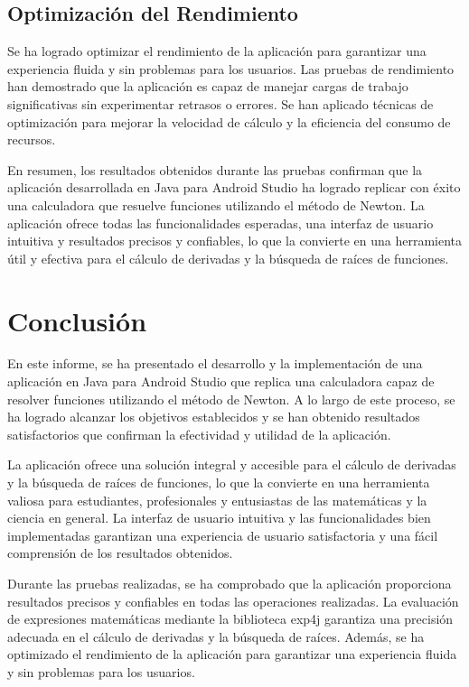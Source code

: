 \documentclass[conference]{IEEEtran}
\begin{document}
\subsection{Optimización del Rendimiento}

Se ha logrado optimizar el rendimiento de la aplicación para garantizar una experiencia fluida y sin problemas para los usuarios. Las pruebas de rendimiento han demostrado que la aplicación es capaz de manejar cargas de trabajo significativas sin experimentar retrasos o errores. Se han aplicado técnicas de optimización para mejorar la velocidad de cálculo y la eficiencia del consumo de recursos.

En resumen, los resultados obtenidos durante las pruebas confirman que la aplicación desarrollada en Java para Android Studio ha logrado replicar con éxito una calculadora que resuelve funciones utilizando el método de Newton. La aplicación ofrece todas las funcionalidades esperadas, una interfaz de usuario intuitiva y resultados precisos y confiables, lo que la convierte en una herramienta útil y efectiva para el cálculo de derivadas y la búsqueda de raíces de funciones.



\section{Conclusión}

En este informe, se ha presentado el desarrollo y la implementación de una aplicación en Java para Android Studio que replica una calculadora capaz de resolver funciones utilizando el método de Newton. A lo largo de este proceso, se ha logrado alcanzar los objetivos establecidos y se han obtenido resultados satisfactorios que confirman la efectividad y utilidad de la aplicación.

La aplicación ofrece una solución integral y accesible para el cálculo de derivadas y la búsqueda de raíces de funciones, lo que la convierte en una herramienta valiosa para estudiantes, profesionales y entusiastas de las matemáticas y la ciencia en general. La interfaz de usuario intuitiva y las funcionalidades bien implementadas garantizan una experiencia de usuario satisfactoria y una fácil comprensión de los resultados obtenidos.

Durante las pruebas realizadas, se ha comprobado que la aplicación proporciona resultados precisos y confiables en todas las operaciones realizadas. La evaluación de expresiones matemáticas mediante la biblioteca exp4j garantiza una precisión adecuada en el cálculo de derivadas y la búsqueda de raíces. Además, se ha optimizado el rendimiento de la aplicación para garantizar una experiencia fluida y sin problemas para los usuarios.
\end{document}
